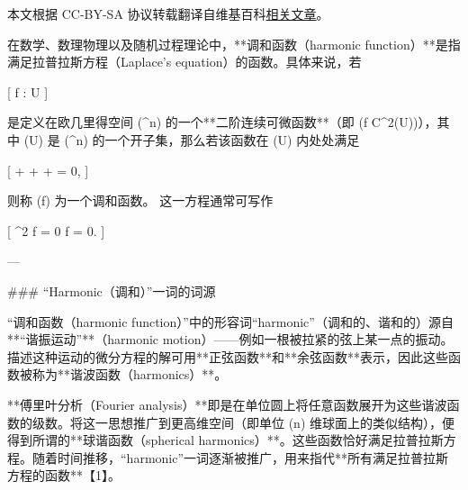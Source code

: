 
本文根据 CC-BY-SA 协议转载翻译自维基百科\href{https://en.wikipedia.org/wiki/Harmonic_function}{相关文章}。

在数学、数理物理以及随机过程理论中，**调和函数（harmonic function）**是指满足拉普拉斯方程（Laplace’s equation）的函数。具体来说，若

[
f : U \to {}
]

是定义在欧几里得空间 (^n) 的一个**二阶连续可微函数**（即 (f \in C^2(U))），其中 (U) 是 (^n) 的一个开子集，那么若该函数在 (U) 内处处满足

[
 +  + \cdots +  = 0,
]

则称 (f) 为一个调和函数。
这一方程通常可写作

[
\nabla^2 f = 0 \quad {} \quad \Delta f = 0.
]

---

### “Harmonic（调和）”一词的词源

“调和函数（harmonic function）”中的形容词“harmonic”（调和的、谐和的）源自**“谐振运动”**（harmonic motion）——例如一根被拉紧的弦上某一点的振动。描述这种运动的微分方程的解可用**正弦函数**和**余弦函数**表示，因此这些函数被称为**谐波函数（harmonics）**。

**傅里叶分析（Fourier analysis）**即是在单位圆上将任意函数展开为这些谐波函数的级数。将这一思想推广到更高维空间（即单位 (n) 维球面上的类似结构），便得到所谓的**球谐函数（spherical harmonics）**。这些函数恰好满足拉普拉斯方程。随着时间推移，“harmonic”一词逐渐被推广，用来指代**所有满足拉普拉斯方程的函数**【1】。
